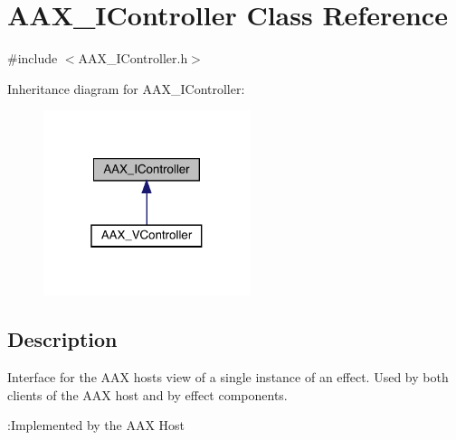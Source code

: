 \hypertarget{a01789}{}\section{A\+A\+X\+\_\+\+I\+Controller Class Reference}
\label{a01789}


{\ttfamily \#include $<$A\+A\+X\+\_\+\+I\+Controller.\+h$>$}



Inheritance diagram for A\+A\+X\+\_\+\+I\+Controller\+:
\nopagebreak
\begin{figure}[H]
\begin{center}
\leavevmode
\includegraphics[width=172pt]{a01788}
\end{center}
\end{figure}


\subsection{Description}
Interface for the A\+AX host\textquotesingle{}s view of a single instance of an effect. Used by both clients of the A\+AX host and by effect components. 

\begin{DoxyRefDesc}{\+:\+Implemented by the A\+A\+X Host}
\item[\mbox{\hyperlink{a00790__aax_host_implementation000004}{\+:\+Implemented by the A\+A\+X Host}}]\end{DoxyRefDesc}
